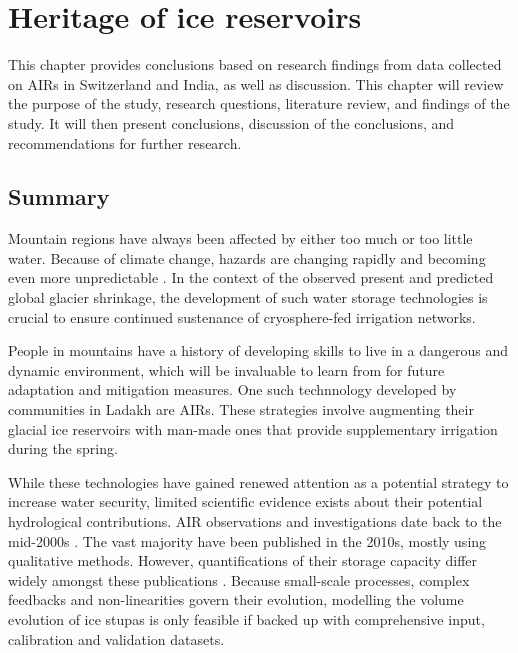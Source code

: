 \chapter{Heritage of ice reservoirs}


This chapter provides conclusions based on research findings from data collected on AIRs in Switzerland and
India, as well as discussion. This chapter will review the purpose of the study, research questions, literature
review, and findings of the study. It will then present conclusions, discussion of the conclusions, and
recommendations for further research.

\section{Summary}

Mountain regions have always been affected by either too much or too little water. Because of climate change,
hazards are changing rapidly and becoming even more unpredictable \citep{ipccCrossChapterPaperMountains2022}. In
the context of the observed present and predicted global glacier shrinkage, the development of such water
storage technologies is crucial to ensure continued sustenance of cryosphere-fed irrigation networks.

People in mountains have a history of developing skills to live in a dangerous and dynamic environment, which
will be invaluable to learn from for future adaptation and mitigation measures. One such technnology developed
by communities in Ladakh are \ac{AIRs}. These strategies involve augmenting their glacial ice reservoirs with
man-made ones that provide supplementary irrigation during the spring. 

While these technologies have gained renewed attention as a potential strategy to increase water security,
limited scientific evidence exists about their potential hydrological contributions. AIR observations and
investigations date back to the mid-2000s \citep{tveitenGlacierGrowingLocal2007}. The vast majority have been
published in the 2010s, mostly using qualitative methods. However, quantifications of their storage capacity
differ widely amongst these publications \citep{baglaArtificialGlaciersHelp1998, norphelSnowWaterHarvesting2015,
nusserSociohydrologyArtificialGlaciers2019}. Because small-scale processes, complex feedbacks and
non-linearities govern their evolution, modelling the volume evolution of ice stupas is only feasible if backed
up with comprehensive input, calibration and validation datasets.

